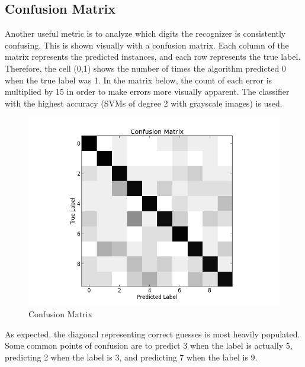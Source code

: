 \documentclass[12pt]{article}
\begin{document}
\subsection*{Confusion Matrix}
Another useful metric is to analyze which digits the recognizer is consistently confusing. This is shown visually with a confusion matrix. Each column of the matrix represents the predicted instances, and each row represents the true label. Therefore, the cell (0,1) shows the number of times the algorithm predicted 0 when the true label was 1. In the matrix below, the count of each error is multiplied by 15 in order to make errors more visually apparent. The classifier with the highest accuracy (SVMs of degree 2 with grayscale images) is used.

\begin{figure}[h]
\centering
  \includegraphics[width=.9\linewidth]{confusion.png}
  \caption{Confusion Matrix}
  \label{fig:conf}
\end{figure}

As expected, the diagonal representing correct guesses is most heavily populated. Some common points of confusion are to predict 3 when the label is actually 5, predicting 2 when the label is 3, and predicting 7 when the label is 9. 
\end{document}
